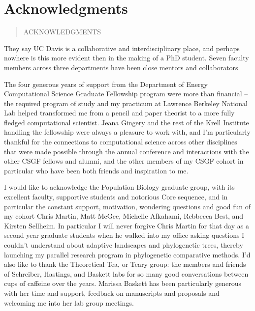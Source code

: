 

\prelimheaders

\chapter*{Acknowledgments}

\begin{quote}
ACKNOWLEDGMENTS
\end{quote}


They say UC Davis is a collaborative and interdisciplinary place, and perhaps nowhere is this more evident then in the making of a PhD student.  Seven faculty members across three departments have been close mentors and collaborators 


The four generous years of support from the Department of Energy Computational Science Graduate Fellowship program were more than financial -- the required program of study and my practicum at Lawrence Berkeley National Lab helped transformed me from a pencil and paper theorist to a more fully fledged computational scientist.  Jeana Gingery and the rest of the Krell Institute handling the fellowship were always a pleasure to work with, and I'm particularly thankful for the connections to computational science across other disciplines that were made possible through the annual conference and interactions with the other CSGF fellows and alumni, and the other members of my CSGF cohort in particular who have been both friends and inspiration to me.  

I would like to acknowledge the Population Biology graduate group, with its excellent faculty, supportive students and notorious Core sequence, and in particular the constant support, motivation, wondering questions and good fun of my cohort Chris Martin, Matt McGee, Michelle Afkahami, Rebbecca Best, and Kirsten Sellheim.  In particular I will never forgive Chris Martin for that day as a second year graduate students when he walked into my office asking questions I couldn't understand about adaptive landscapes and phylogenetic trees, thereby launching my parallel research program in phylogenetic comparative methods.  I'd also like to thank the Theoretical Tea, or Teary group: the members and friends of Schreiber, Hastings, and Baskett labs for so many good conversations between cups of caffeine over the years.  Marissa Baskett has been particularly generous with her time and support, feedback on manuscripts and proposals and welcoming me into her lab group meetings. 

